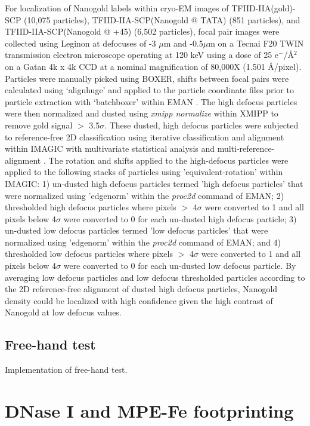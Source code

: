 For localization of Nanogold labels within cryo-EM images of TFIID-IIA(gold)-SCP (10,075 particles), TFIID-IIA-SCP(Nanogold @ TATA) (851 particles), and TFIID-IIA-SCP(Nanogold @ +45) (6,502 particles), focal pair images were collected using Leginon \cite{Suloway_1311} at defocuses of -3 $\mu$m and -0.5$\mu$m on a Tecnai F20 TWIN transmission electron microscope operating at 120 keV using a dose of 25 e$^{-}$/\AA$^{2}$ on a Gatan 4k x 4k CCD at a nominal magnification of 80,000X (1.501 \AA/pixel).  Particles were manually picked using BOXER, shifts between focal pairs were calculated using ‘alignhuge’ and applied to the particle coordinate files prior to particle extraction with ‘batchboxer’ within EMAN \cite{Ludtke_2307}.  The high defocus particles were then normalized and dusted using \emph{xmipp normalize} within XMIPP \cite{Sorzano_1492} to remove gold signal $>$ 3.5$\sigma$. These dusted, high defocus particles were subjected to reference-free 2D classification using iterative classification and alignment within IMAGIC with multivariate statistical analysis and multi-reference-alignment \cite{va_2849}. The rotation and shifts applied to the high-defocus particles were applied to the following stacks of particles using 'equivalent-rotation' within IMAGIC:  1) un-dusted high defocus particles termed 'high defocus particles' that were normalized using 'edgenorm' within the \emph{proc2d} command of EMAN; 2) thresholded high defocus particles where pixels $>$ 4$\sigma$ were converted to 1 and all pixels below 4$\sigma$ were converted to 0 for each un-dusted high defocus particle; 3) un-dusted low defocus particles termed 'low defocus particles' that were normalized using 'edgenorm' within the \emph{proc2d} command of EMAN; and 4) thresholded low defocus particles where pixels $>$ 4$\sigma$ were converted to 1 and all pixels below 4$\sigma$ were converted to 0 for each un-dusted low defocus particle.  By averaging low defocus particles and low defocus thresholded particles according to the 2D reference-free alignment of dusted high defocus particles, Nanogold density could be localized with high confidence given the high contrast of Nanogold at low defocus values.

\subsection{Free-hand test}

Implementation of free-hand test.

\section{DNase I and MPE-Fe footprinting}

